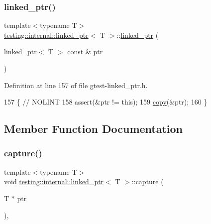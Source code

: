 \subsubsection{\texorpdfstring{linked\+\_\+ptr()}{linked\_ptr()}\hspace{0.1cm}{\footnotesize\ttfamily [3/3]}}
{\footnotesize\ttfamily template$<$typename T$>$ \\
\hyperlink{classtesting_1_1internal_1_1linked__ptr}{testing\+::internal\+::linked\+\_\+ptr}$<$ T $>$\+::\hyperlink{classtesting_1_1internal_1_1linked__ptr}{linked\+\_\+ptr} (\begin{DoxyParamCaption}\item[{\hyperlink{classtesting_1_1internal_1_1linked__ptr}{linked\+\_\+ptr}$<$ T $>$ const \&}]{ptr }\end{DoxyParamCaption})\hspace{0.3cm}{\ttfamily [inline]}}



Definition at line 157 of file gtest-\/linked\+\_\+ptr.\+h.


\begin{DoxyCode}
157                                     \{  \textcolor{comment}{// NOLINT}
158     assert(&ptr != \textcolor{keyword}{this});
159     \hyperlink{classtesting_1_1internal_1_1linked__ptr_aea2859970b65708fc4f7c8c4cbc7928a}{copy}(&ptr);
160   \}
\end{DoxyCode}


\subsection{Member Function Documentation}
\mbox{\label{classtesting_1_1internal_1_1linked__ptr_a0b4623795339fd29bf9303f926ae2824}} 
\subsubsection{\texorpdfstring{capture()}{capture()}}
{\footnotesize\ttfamily template$<$typename T$>$ \\
void \hyperlink{classtesting_1_1internal_1_1linked__ptr}{testing\+::internal\+::linked\+\_\+ptr}$<$ T $>$\+::capture (\begin{DoxyParamCaption}\item[{T $\ast$}]{ptr }\end{DoxyParamCaption})\hspace{0.3cm}{\ttfamily [inline]}, {\ttfamily [private]}}




